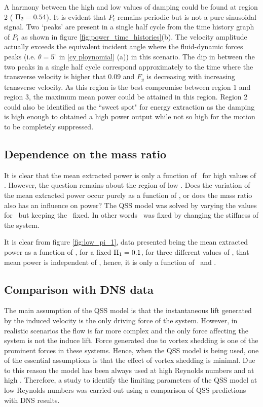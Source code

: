 A harmony between the high and low values of damping could be found at region 2  ( $\Pi_2=0.54$). It is evident that $P_t$ remains periodic but is not a pure sinusoidal signal. Two `peaks' are present in a single half cycle from the time history graph of $P_t$ as shown in figure \ref{fig:power_time_histories}(b). The velocity amplitude actually exceeds the equivalent incident angle where the fluid-dynamic forces peaks (i.e. $\theta=5^\circ$ in \ref{cy ploynomial} (a)) in this scenario. The dip in between the two peaks in a single half cycle correspond approximately to the time where the transverse velocity is higher that 0.09 and $F_y$ is decreasing with increasing transverse velocity. As this region is the best compromise between region 1 and region 3, the maximum mean power could be attained in this region. Region 2 could also be identified as the ``sweet spot" for energy extraction as the damping is high enough to obtained a high power output while not so high for the motion to be completely suppressed. 


\subsection{Dependence on the mass ratio \mstar}
\label{sec:chp-pi_1_pi2_mstar}


It is clear that the mean extracted power is only a function of \massdamp \ for high values of \massstiff. However, the question remains about the region of low \massstiff. Does the variation of the mean extracted power occur purely as a function of \massstiff, or does the mass ratio also has an influence on power? The QSS model was solved by varying the values for \mstar\
but keeping the \massstiff\ fixed. In other words \massstiff\ was fixed by changing the stiffness of the system. 
 
It is clear from figure \ref{fig:low_pi_1}, data presented being the mean extracted power  as a function of \massdamp, for a fixed $\Pi_1 = 0.1$, for three different values of \mstar, that mean power is independent of \mstar, hence, it is only a function of \massstiff\ and \massdamp.




\subsection{Comparison with DNS data}
\label{sec:chp-pi_1_pi2_dns}

The main assumption of the QSS model is that the instantaneous lift generated by the induced velocity is the only driving force of the system. However, in realistic scenarios the flow is far more complex and the only force affecting the system is not the induce lift. Force generated due to vortex shedding is one of the prominent forces in these systems. Hence, when the QSS model is being used, one of the essential assumptions is that the effect of vortex shedding is minimal. Due to this reason the model has been always used at high Reynolds numbers and at high \mstar. Therefore, a study to identify the limiting parameters of the QSS model at low Reynolds numbers was carried out  using a comparison of QSS predictions with DNS results.


